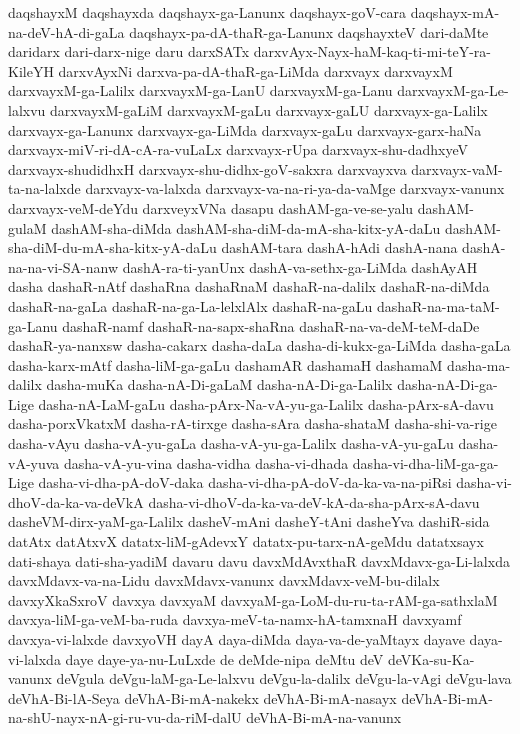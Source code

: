{daqshayxM
daqshayxda
daqshayx-ga-Lanunx
daqshayx-goV-cara
daqshayx-mA-na-deV-hA-di-gaLa
daqshayx-pa-dA-thaR-ga-Lanunx
daqshayxteV
dari-daMte
daridarx
dari-darx-nige
daru
darxSATx
darxvAyx-Nayx-haM-kaq-ti-mi-teY-ra-KileYH
darxvAyxNi
darxva-pa-dA-thaR-ga-LiMda
darxvayx
darxvayxM
darxvayxM-ga-Lalilx
darxvayxM-ga-LanU
darxvayxM-ga-Lanu
darxvayxM-ga-Le-lalxvu
darxvayxM-gaLiM
darxvayxM-gaLu
darxvayx-gaLU
darxvayx-ga-Lalilx
darxvayx-ga-Lanunx
darxvayx-ga-LiMda
darxvayx-gaLu
darxvayx-garx-haNa
darxvayx-miV-ri-dA-cA-ra-vuLaLx
darxvayx-rUpa
darxvayx-shu-dadhxyeV
darxvayx-shudidhxH
darxvayx-shu-didhx-goV-sakxra
darxvayxva
darxvayx-vaM-ta-na-lalxde
darxvayx-va-lalxda
darxvayx-va-na-ri-ya-da-vaMge
darxvayx-vanunx
darxvayx-veM-deYdu
darxveyxVNa
dasapu
dashAM-ga-ve-se-yalu
dashAM-gulaM
dashAM-sha-diMda
dashAM-sha-diM-da-mA-sha-kitx-yA-daLu
dashAM-sha-diM-du-mA-sha-kitx-yA-daLu
dashAM-tara
dashA-hAdi
dashA-nana
dashA-na-na-vi-SA-nanw
dashA-ra-ti-yanUnx
dashA-va-sethx-ga-LiMda
dashAyAH
dasha
dashaR-nAtf
dashaRna
dashaRnaM
dashaR-na-dalilx
dashaR-na-diMda
dashaR-na-gaLa
dashaR-na-ga-La-lelxlAlx
dashaR-na-gaLu
dashaR-na-ma-taM-ga-Lanu
dashaR-namf
dashaR-na-sapx-shaRna
dashaR-na-va-deM-teM-daDe
dashaR-ya-nanxsw
dasha-cakarx
dasha-daLa
dasha-di-kukx-ga-LiMda
dasha-gaLa
dasha-karx-mAtf
dasha-liM-ga-gaLu
dashamAR
dashamaH
dashamaM
dasha-ma-dalilx
dasha-muKa
dasha-nA-Di-gaLaM
dasha-nA-Di-ga-Lalilx
dasha-nA-Di-ga-Lige
dasha-nA-LaM-gaLu
dasha-pArx-Na-vA-yu-ga-Lalilx
dasha-pArx-sA-davu
dasha-porxVkatxM
dasha-rA-tirxge
dasha-sAra
dasha-shataM
dasha-shi-va-rige
dasha-vAyu
dasha-vA-yu-gaLa
dasha-vA-yu-ga-Lalilx
dasha-vA-yu-gaLu
dasha-vA-yuva
dasha-vA-yu-vina
dasha-vidha
dasha-vi-dhada
dasha-vi-dha-liM-ga-ga-Lige
dasha-vi-dha-pA-doV-daka
dasha-vi-dha-pA-doV-da-ka-va-na-piRsi
dasha-vi-dhoV-da-ka-va-deVkA
dasha-vi-dhoV-da-ka-va-deV-kA-da-sha-pArx-sA-davu
dasheVM-dirx-yaM-ga-Lalilx
dasheV-mAni
dasheY-tAni
dasheYva
dashiR-sida
datAtx
datAtxvX
datatx-liM-gAdevxY
datatx-pu-tarx-nA-geMdu
datatxsayx
dati-shaya
dati-sha-yadiM
davaru
davu
davxMdAvxthaR
davxMdavx-ga-Li-lalxda
davxMdavx-va-na-Lidu
davxMdavx-vanunx
davxMdavx-veM-bu-dilalx
davxyXkaSxroV
davxya
davxyaM
davxyaM-ga-LoM-du-ru-ta-rAM-ga-sathxlaM
davxya-liM-ga-veM-ba-ruda
davxya-meV-ta-namx-hA-tamxnaH
davxyamf
davxya-vi-lalxde
davxyoVH
dayA
daya-diMda
daya-va-de-yaMtayx
dayave
daya-vi-lalxda
daye
daye-ya-nu-LuLxde
de
deMde-nipa
deMtu
deV
deVKa-su-Ka-vanunx
deVgula
deVgu-laM-ga-Le-lalxvu
deVgu-la-dalilx
deVgu-la-vAgi
deVgu-lava
deVhA-Bi-lA-Seya
deVhA-Bi-mA-nakekx
deVhA-Bi-mA-nasayx
deVhA-Bi-mA-na-shU-nayx-nA-gi-ru-vu-da-riM-dalU
deVhA-Bi-mA-na-vanunx
}
